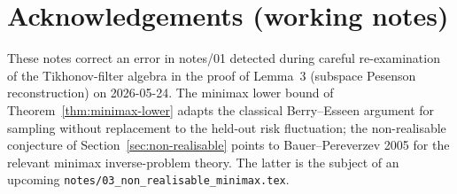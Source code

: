 \documentclass[11pt,a4paper]{article}
\theoremstyle{plain}
\theoremstyle{definition}
\theoremstyle{remark}
\begin{document}
\section*{Acknowledgements (working notes)}

These notes correct an error in notes/01 detected during careful
re-examination of the Tikhonov-filter algebra in the proof of
Lemma~3 (subspace Pesenson reconstruction) on 2026-05-24.  The
minimax lower bound of Theorem~\ref{thm:minimax-lower} adapts the
classical Berry--Esseen argument for sampling without replacement
to the held-out risk fluctuation; the non-realisable conjecture
of Section~\ref{sec:non-realisable} points to
Bauer--Pereverzev 2005 for the relevant minimax inverse-problem
theory.  The latter is the subject of an upcoming
\texttt{notes/03\_non\_realisable\_minimax.tex}.
\end{document}
